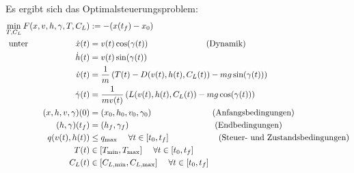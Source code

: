 Es ergibt sich das Optimalsteuerungsproblem:
\[\begin{split}
\min_{T, C_L} F(x,v,h,\gamma,T,C_L) &:= -(x(t_f) - x_0) \\\
\text{unter}  \hspace{20mm} \dot{x}(t) &= v(t) \cos(\gamma(t)) \ \qquad \qquad \qquad  \ \ \text{(Dynamik)}\\\
\dot{h}(t) &= v(t) \sin(\gamma(t)) \\\
\dot{v}(t) &= \dfrac{1}{m} \left( T(t) - D(v(t),h(t),C_L(t)) - mg \sin(\gamma(t)) \right) \\\
\dot{\gamma}(t) &=  \dfrac{1}{mv(t)} \left( L(v(t),h(t),C_L(t)) - mg \cos(\gamma(t)) \right) \\\
%
(x,h,v,\gamma)(0) &= (x_0,h_0,v_0,\gamma_0) \qquad \qquad \qquad \ \ \ \ \text{(Anfangsbedingungen)}\\\
(h,\gamma)(t_f) &= (h_f,\gamma_f) \qquad \qquad \qquad \qquad \qquad  \  \text{(Endbedingungen)}\\\
%
q(v(t),h(t)) &\leq q_{\max} \ \ \ \ \forall t \in [t_0,t_f] \qquad \qquad  \ \ \ \ \ \ \text{(Steuer- und Zustandsbedingungen)}\\\
T(t) &\in [T_{\min},T_{\max}] \ \ \ \ \forall t \in [t_0,t_f] \\\
C_L(t) &\in [C_{L, \min},C_{L, \max}] \ \ \ \ \forall t \in [t_0,t_f] \\\
\end{split} \]









